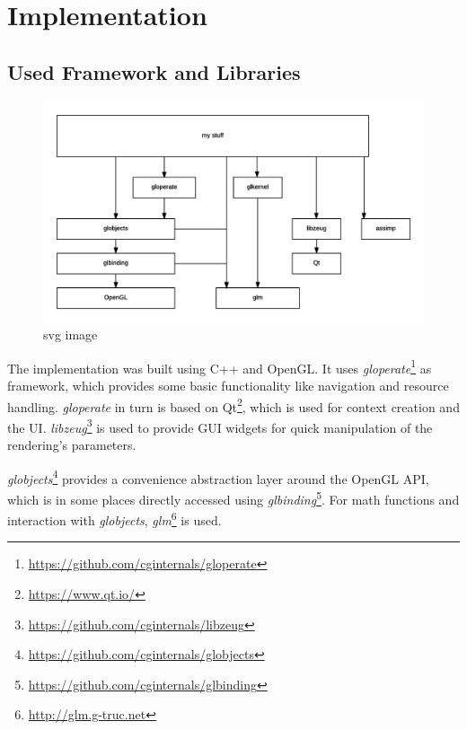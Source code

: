 

\chapter{Implementation}
\label{chap:implementation}


\section{Used Framework and Libraries}

\begin{figure}[htbp]
  \centering
  \includegraphics{graphics/Architecture}
  \caption{svg image}
\end{figure}

The implementation was built using C++ and OpenGL. It uses \textit{gloperate}\footnote{\url{https://github.com/cginternals/gloperate}} as framework, which provides some basic functionality like navigation and resource handling. \textit{gloperate} in turn is based on Qt\footnote{\url{https://www.qt.io/}}, which is used for context creation and the UI. \textit{libzeug}\footnote{\url{https://github.com/cginternals/libzeug}} is used to provide GUI widgets for quick manipulation of the rendering's parameters.

\textit{globjects}\footnote{\url{https://github.com/cginternals/globjects}} provides a convenience abstraction layer around the OpenGL API, which is in some places directly accessed using \textit{glbinding}\footnote{\url{https://github.com/cginternals/glbinding}}. For math functions and interaction with \textit{globjects}, \textit{glm}\footnote{\url{http://glm.g-truc.net}} is used.

